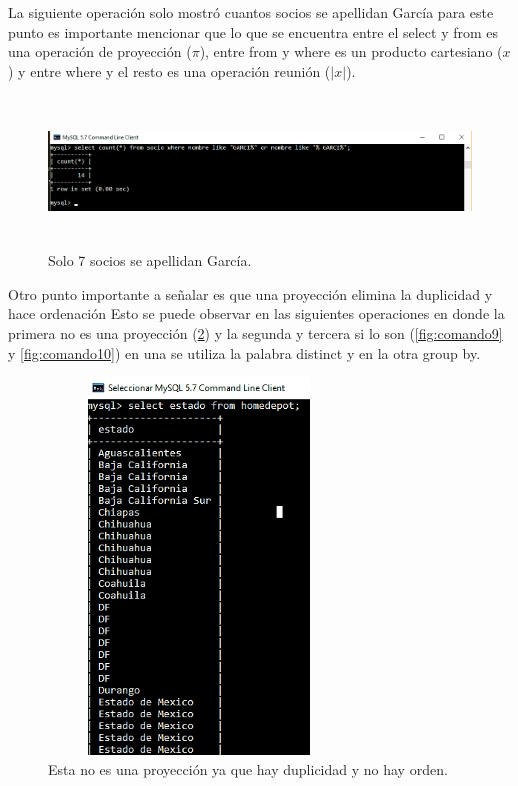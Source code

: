 \documentclass[12pt, titlepage]{article}
\begin{document}
La siguiente operación solo mostró cuantos socios se apellidan García para este punto es importante mencionar que lo que se encuentra entre el select y from es una operación de proyección ($\pi$), entre from y where es un producto cartesiano ($x$) y entre where y el resto es una operación reunión ($|x|$).
 \begin{figure}[H]
	\begin{center}
		\includegraphics[width=15cm, height=4cm]{img/comando7.png}
		\caption{Solo 7 socios se apellidan García.}
		\label{fig:comando7}
	\end{center}
\end{figure}
Otro punto importante a señalar es que una proyección elimina la duplicidad y hace ordenación Esto se puede observar en las siguientes operaciones en donde la primera no es una proyección (\ref{fig:comando8}) y la segunda y tercera si lo son (\ref{fig:comando9} y \ref{fig:comando10}) en una se utiliza la palabra distinct y en la otra group by.
 \begin{figure}[H]
	\begin{center}
		\includegraphics[width=8cm, height=10cm]{img/comando8.png}
		\caption{Esta no es una proyección ya que hay duplicidad y no hay orden.}
		\label{fig:comando8}
	\end{center}
\end{figure}
\end{document}
